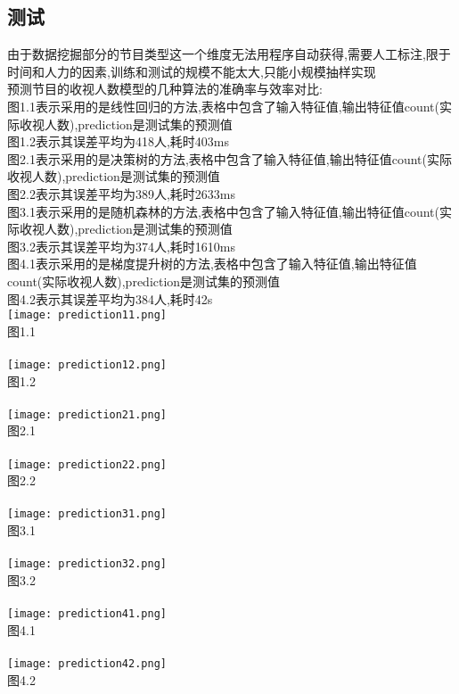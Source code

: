 \documentclass{hitreport}
\begin{document}
\subsection{测试}
由于数据挖掘部分的节目类型这一个维度无法用程序自动获得,需要人工标注,限于时间和人力的因素,训练和测试的规模不能太大,只能小规模抽样实现\\
预测节目的收视人数模型的几种算法的准确率与效率对比:\\
图1.1表示采用的是线性回归的方法,表格中包含了输入特征值,输出特征值count(实际收视人数),prediction是测试集的预测值\\
图1.2表示其误差平均为418人,耗时403ms\\
图2.1表示采用的是决策树的方法,表格中包含了输入特征值,输出特征值count(实际收视人数),prediction是测试集的预测值\\
图2.2表示其误差平均为389人,耗时2633ms\\
图3.1表示采用的是随机森林的方法,表格中包含了输入特征值,输出特征值count(实际收视人数),prediction是测试集的预测值\\
图3.2表示其误差平均为374人,耗时1610ms\\
图4.1表示采用的是梯度提升树的方法,表格中包含了输入特征值,输出特征值count(实际收视人数),prediction是测试集的预测值\\
图4.2表示其误差平均为384人,耗时42s\\
\texttt{[image: prediction11.png]}\\
图1.1\\
~\\
\texttt{[image: prediction12.png]}\\
图1.2\\
~\\
\texttt{[image: prediction21.png]}\\
图2.1\\
~\\
\texttt{[image: prediction22.png]}\\
图2.2\\
~\\
\texttt{[image: prediction31.png]}\\
图3.1\\
~\\
\texttt{[image: prediction32.png]}\\
图3.2\\
~\\
\texttt{[image: prediction41.png]}\\
图4.1\\
~\\
\texttt{[image: prediction42.png]}\\
图4.2\\
~\\
\end{document}

